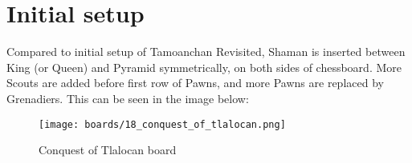 \clearpage %

\section*{Initial setup}
\label{sec:Conquest of Tlalocan/Initial setup}

Compared to initial setup of Tamoanchan Revisited, Shaman is inserted between
King (or Queen) and Pyramid symmetrically, on both sides of chessboard. More
Scouts are added before first row of Pawns, and more Pawns are replaced by
Grenadiers. This can be seen in the image below:

\noindent
\begin{figure}[h]
\texttt{[image: boards/18\_conquest\_of\_tlalocan.png]}
\caption{Conquest of Tlalocan board}
\label{fig:18_conquest_of_tlalocan}
\end{figure}

\clearpage %
